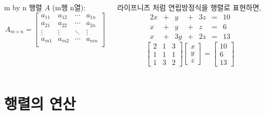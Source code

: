 \documentclass[aspectratio=169]{beamer}
\begin{document}
\begin{frame}
  \begin{columns}
    \begin{column}{0.5\textwidth}
      m by n 행렬 $A$ (m행 n열): \\
      \[
        A_{m\times n} =
        \left[ {\begin{array}{cccc}
          a_{11} & a_{12} & \cdots & a_{1n}\\
          a_{21} & a_{22} & \cdots & a_{2n}\\
          \vdots & \vdots & \ddots & \vdots\\
          a_{m1} & a_{m2} & \cdots & a_{mn}\\
        \end{array} } \right]
      \]    
    \end{column}
    \begin{column}{0.5\textwidth}
      라이프니츠 처럼 연립방정식을 행렬로 표현하면,\\
      \begin{alignat*}{4}
        2x & {}+{} &  y & {}+{} & 3z & {}={} & 10 \\
         x & {}+{} &  y & {}+{} &  z & {}={} &  6 \\
         x & {}+{} & 3y & {}+{} & 2z & {}={} & 13
      \end{alignat*}
      \centering{$\Downarrow$}
      \[
      \begin{bmatrix}
        2 & 1 & 3 \\
        1 & 1 & 1 \\
        1 & 3 & 2 
      \end{bmatrix}
      \begin{bmatrix}
        x \\ y \\ z 
      \end{bmatrix}
      =
      \begin{bmatrix}
        10 \\ 6 \\ 13 
      \end{bmatrix}
      \]
    \end{column}
  \end{columns}
\end{frame}




\section{행렬의 연산 }
\end{document}
